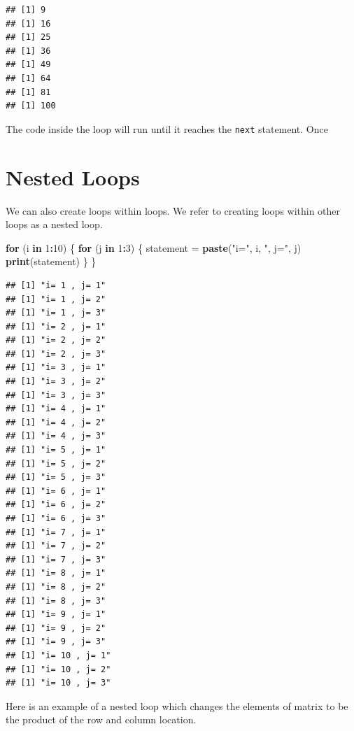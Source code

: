 \documentclass[
]{book}
\newenvironment{Shaded}{\begin{snugshade}}{\end{snugshade}}
\newcommand{\ControlFlowTok}[1]{\textcolor[rgb]{0.13,0.29,0.53}{\textbf{#1}}}
\newcommand{\DecValTok}[1]{\textcolor[rgb]{0.00,0.00,0.81}{#1}}
\newcommand{\KeywordTok}[1]{\textcolor[rgb]{0.13,0.29,0.53}{\textbf{#1}}}
\newcommand{\NormalTok}[1]{#1}
\newcommand{\OperatorTok}[1]{\textcolor[rgb]{0.81,0.36,0.00}{\textbf{#1}}}
\newcommand{\StringTok}[1]{\textcolor[rgb]{0.31,0.60,0.02}{#1}}
\begin{document}
\begin{verbatim}
## [1] 9
## [1] 16
## [1] 25
## [1] 36
## [1] 49
## [1] 64
## [1] 81
## [1] 100
\end{verbatim}

The code inside the loop will run until it reaches the \texttt{next} statement. Once

\hypertarget{nested-loops}{%
\section{Nested Loops}\label{nested-loops}}

We can also create loops within loops. We refer to creating loops within other loops as a nested loop.

\begin{Shaded}
\begin{Highlighting}[]
\ControlFlowTok{for}\NormalTok{ (i }\ControlFlowTok{in} \DecValTok{1}\OperatorTok{:}\DecValTok{10}\NormalTok{) \{}
    \ControlFlowTok{for}\NormalTok{ (j }\ControlFlowTok{in} \DecValTok{1}\OperatorTok{:}\DecValTok{3}\NormalTok{) \{}
\NormalTok{        statement =}\StringTok{ }\KeywordTok{paste}\NormalTok{(}\StringTok{"i="}\NormalTok{, i, }\StringTok{", j="}\NormalTok{, j)}
        \KeywordTok{print}\NormalTok{(statement)}
\NormalTok{    \}}
\NormalTok{\}}
\end{Highlighting}
\end{Shaded}

\begin{verbatim}
## [1] "i= 1 , j= 1"
## [1] "i= 1 , j= 2"
## [1] "i= 1 , j= 3"
## [1] "i= 2 , j= 1"
## [1] "i= 2 , j= 2"
## [1] "i= 2 , j= 3"
## [1] "i= 3 , j= 1"
## [1] "i= 3 , j= 2"
## [1] "i= 3 , j= 3"
## [1] "i= 4 , j= 1"
## [1] "i= 4 , j= 2"
## [1] "i= 4 , j= 3"
## [1] "i= 5 , j= 1"
## [1] "i= 5 , j= 2"
## [1] "i= 5 , j= 3"
## [1] "i= 6 , j= 1"
## [1] "i= 6 , j= 2"
## [1] "i= 6 , j= 3"
## [1] "i= 7 , j= 1"
## [1] "i= 7 , j= 2"
## [1] "i= 7 , j= 3"
## [1] "i= 8 , j= 1"
## [1] "i= 8 , j= 2"
## [1] "i= 8 , j= 3"
## [1] "i= 9 , j= 1"
## [1] "i= 9 , j= 2"
## [1] "i= 9 , j= 3"
## [1] "i= 10 , j= 1"
## [1] "i= 10 , j= 2"
## [1] "i= 10 , j= 3"
\end{verbatim}

Here is an example of a nested loop which changes the elements of matrix to be the product of the row and column location.
\end{document}
